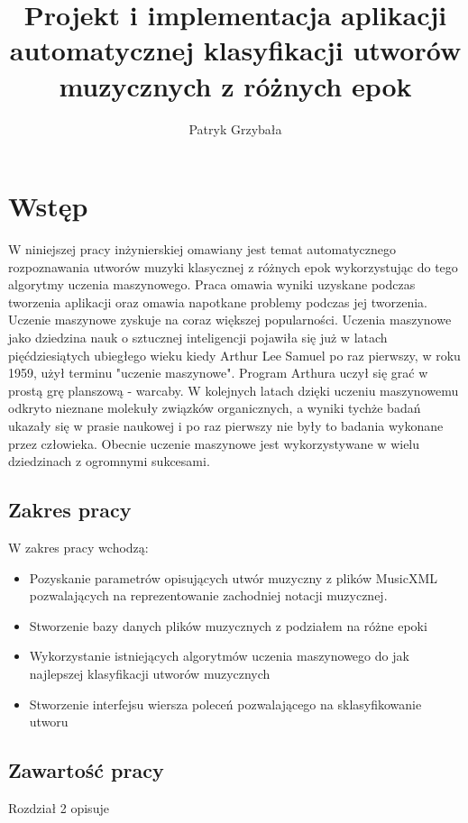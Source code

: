 \documentclass[printmode, eng]{mgr}
\title{Projekt i implementacja aplikacji automatycznej klasyfikacji utworów muzycznych z różnych epok}
\author{Patryk Grzybała}
\begin{document}
\maketitle

\tableofcontents

\chapter{Wstęp}
\qquad W niniejszej pracy inżynierskiej omawiany jest temat automatycznego rozpoznawania utworów muzyki klasycznej z różnych epok wykorzystując do tego algorytmy uczenia maszynowego. Praca omawia wyniki uzyskane podczas tworzenia aplikacji oraz omawia napotkane problemy podczas jej tworzenia. \\

\qquad Uczenie maszynowe zyskuje na coraz większej popularności. Uczenia maszynowe jako dziedzina nauk o sztucznej inteligencji pojawiła się już w latach pięćdziesiątych ubiegłego wieku kiedy Arthur Lee Samuel po raz pierwszy, w roku 1959, użył terminu "uczenie maszynowe". Program Arthura uczył się grać w prostą grę planszową - warcaby. W kolejnych latach dzięki uczeniu maszynowemu odkryto nieznane molekuły związków organicznych, a wyniki tychże badań ukazały się w prasie naukowej i po raz pierwszy nie były to badania wykonane przez człowieka. Obecnie uczenie maszynowe jest wykorzystywane w wielu dziedzinach z ogromnymi sukcesami.
\section{Zakres pracy}
\qquad W zakres pracy wchodzą:
\begin{itemize}
\item Pozyskanie parametrów opisujących utwór muzyczny z plików MusicXML pozwalających na reprezentowanie zachodniej notacji muzycznej.
\item Stworzenie bazy danych plików muzycznych z podziałem na różne epoki
\item Wykorzystanie istniejących algorytmów uczenia maszynowego do jak najlepszej klasyfikacji utworów muzycznych
\item Stworzenie interfejsu wiersza poleceń pozwalającego na sklasyfikowanie utworu
\end{itemize}
\section{Zawartość pracy}
Rozdział 2 opisuje 
\end{document}

